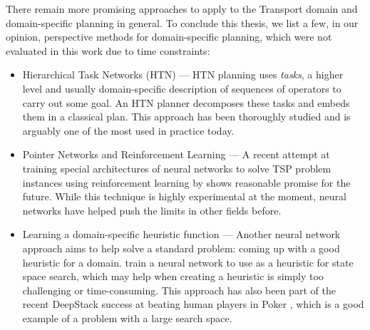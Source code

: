 There remain more promising approaches to apply to the Transport domain
and domain-specific planning in general.
To conclude this thesis, we list a few, in our opinion, perspective methods for domain-specific planning, which were not
evaluated in this work due to time constraints:
\begin{itemize}
\item Hierarchical Task Networks (HTN) --- 
HTN planning \citet[Chapter~11]{Ghallab2004} uses \textit{tasks},
a higher level and usually domain-specific description of sequences of operators
to carry out some goal. An HTN planner decomposes these tasks and embeds them in a classical plan. This approach has been thoroughly studied and is arguably one of the most used in practice today.

\item Pointer Networks and Reinforcement Learning --- 
A recent attempt at training special architectures of neural networks to solve TSP problem instances using reinforcement learning by \citet{Bello2016} shows
reasonable promise for the future. While this technique is highly experimental at the moment,
neural networks have helped push the limits in other fields before.

\item Learning a domain-specific heuristic function --- Another neural network
approach aims to help solve a standard problem: coming up with a good heuristic for a domain. \citet{Chen2011}
train a neural network to use as a heuristic for state space search,
which may help when creating a heuristic is simply too challenging or time-consuming.
This approach has also been part of the recent DeepStack success at
beating human players in Poker \citep{Moravcik2017}, which is a good example of a problem with a large search space.
\end{itemize}